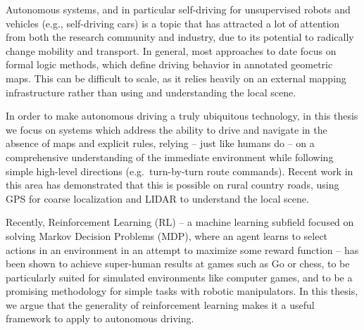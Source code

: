 		
			Autonomous systems, and in particular self-driving for unsupervised robots and vehicles (e.g., self-driving cars) is a topic that has attracted a lot of attention from both the research community and industry, due to its potential to radically change mobility and transport. In general, most approaches to date focus on formal logic methods, which define driving behavior in annotated geometric maps. This can be difficult to scale, as it relies heavily on an external mapping infrastructure rather than using and understanding the local scene.
			
			In order to make autonomous driving a truly ubiquitous technology, in this thesis we focus on systems which address the ability to drive and navigate in the absence of maps and explicit rules, relying – just like humans do – on a comprehensive understanding of the immediate environment while following simple high-level directions (e.g.\ turn-by-turn route commands). Recent work in this area has demonstrated that this is possible on rural country roads, using GPS for coarse localization and LIDAR to understand the local scene. 
			
			Recently, Reinforcement Learning (RL) – a machine learning subfield focused on solving Markov Decision Problems (MDP), where an agent learns to select actions in an environment in an attempt to maximize some reward function – has been shown to achieve super-human results at games such as Go or chess, to be particularly suited for simulated environments like computer games, and to be a promising methodology for simple tasks with robotic manipulators. In this thesis, we argue that the generality of reinforcement learning makes it a useful framework to apply to autonomous driving. 
			
